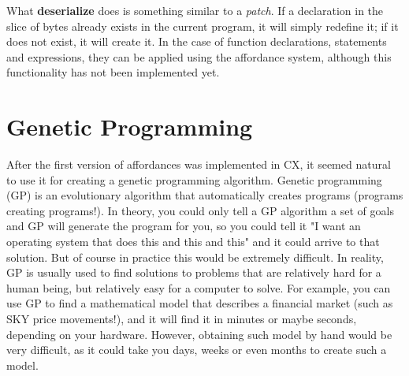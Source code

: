 \documentclass[11pt,fleqn,openany]{book} %
\begin{document}
What \textbf{deserialize} does is something similar to a \emph{patch}. If a declaration in the slice of bytes already exists in the current program, it will simply redefine it; if it does not exist, it will create it. In the case of function declarations, statements and expressions, they can be applied using the affordance system, although this functionality has not been implemented yet.


\chapter{Genetic Programming}
\label{chapter:genetic-programming}


After the first version of affordances was implemented in CX, it seemed natural to use it for creating a genetic programming algorithm. Genetic programming (GP) is an evolutionary algorithm that automatically creates programs (programs creating programs!). In theory, you could only tell a GP algorithm a set of goals and GP will generate the program for you, so you could tell it "I want an operating system that does this and this and this" and it could arrive to that solution. But of course in practice this would be extremely difficult. In reality, GP is usually used to find solutions to problems that are relatively hard for a human being, but relatively easy for a computer to solve. For example, you can use GP to find a mathematical model that describes a financial market (such as SKY price movements!), and it will find it in minutes or maybe seconds, depending on your hardware. However, obtaining such model by hand would be very difficult, as it could take you days, weeks or even months to create such a model.
\end{document}

